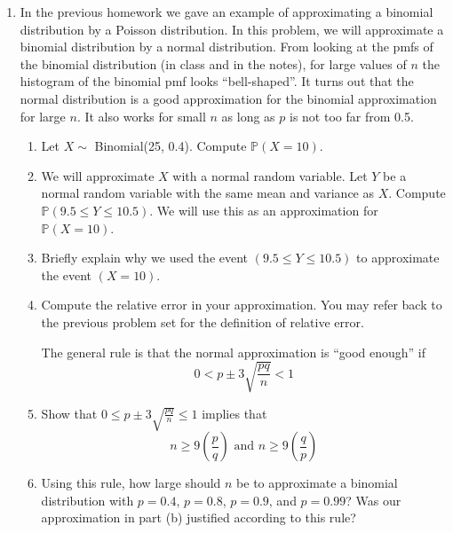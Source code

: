 \documentclass[12pt]{article}
\def\P{{\mathbb P}}
\begin{document}
\begin{enumerate}
\begin{enumerate}
\end{enumerate}

\item In the previous homework we gave an example of approximating a binomial distribution by a Poisson distribution. In this problem, we will approximate a binomial distribution by a normal distribution. From looking at the pmfs of the binomial distribution (in class and in the notes), for large values of $n$ the histogram of the binomial pmf looks ``bell-shaped''. It turns out that the normal distribution is a good approximation for the binomial approximation for large $n$. It also works for small $n$ as long as $p$ is not too far from 0.5.\\

\begin{enumerate}
\item Let $X \sim$ Binomial(25, 0.4). Compute $\P(X = 10)$.
\item We will approximate $X$ with a normal random variable. Let $Y$ be a normal random variable with the same mean and variance as $X$. Compute $\P(9.5 \leq Y \leq 10.5)$. We will use this as an approximation for $\P(X = 10)$.
\item Briefly explain why we used the event $(9.5 \leq Y \leq 10.5)$ to approximate the event $(X = 10)$.
\item Compute the relative error in your approximation. You may refer back to the previous problem set for the definition of relative error.

The general rule is that the normal approximation is ``good enough'' if
\[
0 < p \pm 3 \sqrt{\frac{pq}{n}} < 1
\]

\item Show that $0 \leq p \pm 3 \sqrt{\frac{pq}{n}} \leq 1$ implies that
\[
n \geq 9\left( \frac{p}{q} \right) \text{ and } n \geq 9\left( \frac{q}{p} \right)
\]

\item Using this rule, how large should $n$ be to approximate a binomial distribution with $p = 0.4$, $p = 0.8$, $p = 0.9$, and $p = 0.99$? Was our approximation in part (b) justified according to this rule?

\end{enumerate}

\end{enumerate}
\end{document}
